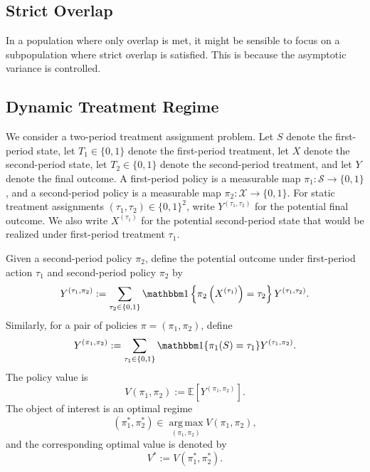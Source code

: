 \documentclass[12pt]{article}
\newcommand{\1}{\mathbf{1}}
\begin{document}
\subsection{Strict Overlap}
In a population where only overlap is met, it might be sensible to focus on a subpopulation where strict overlap is satisfied. This is because the asymptotic variance is controlled.



\subsection{Dynamic Treatment Regime}
\label{subsec:dynamic_treatment_regime}

We consider a two-period treatment assignment problem. Let $S$ denote the
first-period state, let $T_1\in\{0,1\}$ denote the first-period treatment, let
$X$ denote the second-period state, let $T_2\in\{0,1\}$ denote the second-period
treatment, and let $Y$ denote the final outcome. A first-period policy is a
measurable map $\pi_1:\mathcal S\to\{0,1\}$, and a second-period policy is a
measurable map $\pi_2:\mathcal X\to\{0,1\}$. For static treatment assignments
$(\tau_1,\tau_2)\in\{0,1\}^2$, write $Y^{(\tau_1,\tau_2)}$ for the potential
final outcome. We also write $X^{(\tau_1)}$ for the potential second-period
state that would be realized under first-period treatment $\tau_1$.

Given a second-period policy $\pi_2$, define the potential outcome under
first-period action $\tau_1$ and second-period policy $\pi_2$ by
\[
Y^{(\tau_1,\pi_2)}
:=
\sum_{\tau_2\in\{0,1\}}
\mathbbm 1\left\{\pi_2\left(X^{(\tau_1)}\right)=\tau_2\right\}
Y^{(\tau_1,\tau_2)}.
\]
Similarly, for a pair of policies $\pi=(\pi_1,\pi_2)$, define
\[
Y^{(\pi_1,\pi_2)}
:=
\sum_{\tau_1\in\{0,1\}}
\mathbbm 1\{\pi_1(S)=\tau_1\}
Y^{(\tau_1,\pi_2)}.
\]
The policy value is
\[
V(\pi_1,\pi_2)
:=
\mathbb E\!\left[Y^{(\pi_1,\pi_2)}\right].
\]
The object of interest is an optimal regime
\[
(\pi_1^*,\pi_2^*)
\in
\operatorname*{arg\,max}_{(\pi_1,\pi_2)}V(\pi_1,\pi_2),
\]
and the corresponding optimal value is denoted by
\[
V^*:=V(\pi_1^*,\pi_2^*).
\]
\end{document}
